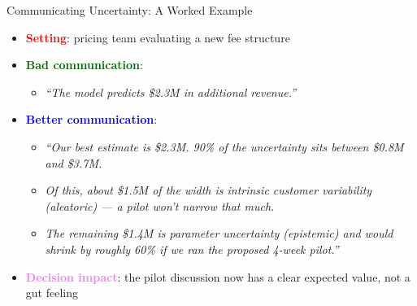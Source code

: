 \documentclass[
  10pt,
  ignorenonframetext,
]{beamer}
\providecommand{\tightlist}{%
  \setlength{\itemsep}{0pt}\setlength{\parskip}{0pt}}
\begin{document}
\begin{frame}{Communicating Uncertainty: A Worked Example}
\label{communicating-uncertainty-a-worked-example}
\begin{itemize}
\item
  \textbf{\textcolor{red}{Setting}}: pricing team evaluating a new fee
  structure
\item
  \textbf{\textcolor{darkgreen}{Bad communication}}:

  \begin{itemize}
  \tightlist
  \item
    \emph{``The model predicts \$2.3M in additional revenue.''}
  \end{itemize}
\item
  \textbf{\textcolor{blue}{Better communication}}:

  \begin{itemize}
  \tightlist
  \item
    \emph{``Our best estimate is \$2.3M. 90\% of the uncertainty sits
    between \$0.8M and \$3.7M.}
  \item
    \emph{Of this, about \$1.5M of the width is intrinsic customer
    variability (aleatoric) --- a pilot won't narrow that much.}
  \item
    \emph{The remaining \$1.4M is parameter uncertainty (epistemic) and
    would shrink by roughly 60\% if we ran the proposed 4-week pilot.''}
  \end{itemize}
\item
  \textbf{\textcolor{violet}{Decision impact}}: the pilot discussion now
  has a clear expected value, not a gut feeling
\end{itemize}
\end{frame}
\end{document}
